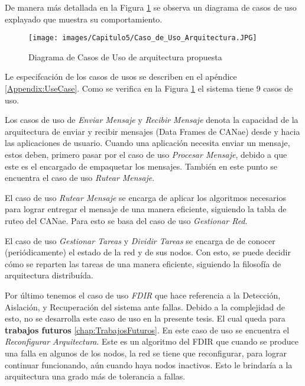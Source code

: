 De manera más detallada en la Figura \ref{fig:DiagramaCUArqPropuesta} se
observa un diagrama de casos de uso explayado que muestra su comportamiento.

\begin{figure}[h!]
 \centering
 \texttt{[image: images/Capitulo5/Caso\_de\_Uso\_Arquitectura.JPG]}
  \caption{Diagrama de Casos de Uso de arquitectura propuesta}
\label{fig:DiagramaCUArqPropuesta}
\end{figure} 

Le especifcación de los casos de usos se describen en el apéndice \ref{Appendix:UseCase}.
Como se verifica en la Figura \ref{fig:DiagramaCUArqPropuesta}
el sistema tiene 9 casos de uso.

Los casos de uso de \textit{Enviar Mensaje} y \textit{Recibir Mensaje} denota la
capacidad de la arquitectura de enviar y recibir mensajes (Data Frames de
CANae) desde y hacia las aplicaciones de usuario. Cuando una aplicación
necesita enviar un mensaje, estos deben, primero pasar por el caso de uso
\textit{Procesar Mensaje}, debido a que  este es el encargado de empaquetar los mensajes.
También en este punto se encuentra el caso de uso \textit{Rutear
  Mensaje}.

El caso de uso \textit{Rutear Mensaje} se encarga de aplicar los algoritmos
necesarios para lograr entregar el mensaje de una manera eficiente, siguiendo
la tabla de ruteo del CANae. Para esto se basa del caso de uso \textit{Gestionar
  Red}.

El caso de uso \textit{Gestionar Tareas} y \textit{Dividir Tareas} se encarga de
de conocer (periódicamente) el estado de la red y de sus nodos. Con esto, se puede
decidir cómo se reparten las tareas de una manera eficiente, siguiendo
la filosofía de arquitectura distribuída.

Por último tenemos el caso de uso \textit{FDIR} que hace referencia a la
Detección, Aislación, y Recuperación del sistema ante fallas. Debido a la
complejidad de esto, no se desarrolla este caso de uso en la presente tesis.
El cual queda para \textbf{trabajos futuros} \ref{chap:TrabajosFuturos}. En este
caso de uso se encuentra el \textit{Reconfigurar Arquitectura}. Este es un
algoritmo del \ac{FDIR} que cuando se produce una falla en algunos de los
nodos, la red se tiene que reconfigurar, para lograr continuar funcionando,
aún cuando haya nodos inactivos. Esto le brindaría a la arquitectura una grado
más de tolerancia a fallas. 



